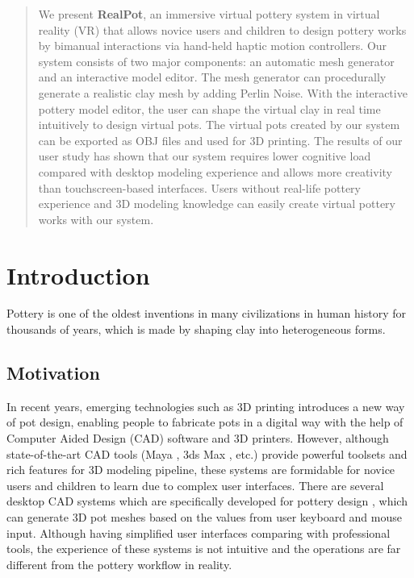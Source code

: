 \documentclass{svjour3}                     %
\begin{document}
\begin{abstract}
We present \textbf{RealPot}, an immersive virtual pottery system in virtual reality (VR) that allows novice users and children to design pottery works by bimanual interactions via hand-held haptic motion controllers.
Our system consists of two major components: an automatic mesh generator and an interactive model editor.
The mesh generator can procedurally generate a realistic clay mesh by adding Perlin Noise. With the interactive pottery model editor, the user can shape the virtual clay in real time intuitively to design virtual pots.
The virtual pots created by our system can be exported as OBJ files and used for 3D printing.
The results of our user study has shown that our system requires lower cognitive load compared with desktop modeling experience and allows more creativity than touchscreen-based interfaces. Users without real-life pottery experience and 3D modeling knowledge can easily create virtual pottery works with our system.

\end{abstract}


\section{Introduction}
\label{sec:1}
Pottery is one of the oldest inventions in many civilizations in human history for thousands of years, which is made by shaping clay into heterogeneous forms.

\subsection{Motivation}
\label{sec:1.1}
In recent years, emerging technologies such as 3D printing introduces a new way of pot design, enabling people to fabricate pots in a digital way with the help of Computer Aided Design (CAD) software and 3D printers.
However, although state-of-the-art CAD tools (Maya \cite{website:maya}, 3ds Max \cite{website:3dmax}, etc.) provide powerful toolsets and rich features for 3D modeling pipeline, these systems are formidable for novice users and children to learn due to complex user interfaces.
There are several desktop CAD systems which are specifically developed for pottery design \cite{koutsoudis2009qp,kumar2011wheel}, which can generate 3D pot meshes based on the values from user keyboard and mouse input. Although having simplified user interfaces comparing with professional tools, the experience of these systems is not intuitive and the operations are far different from the pottery workflow in reality.
\end{document}
